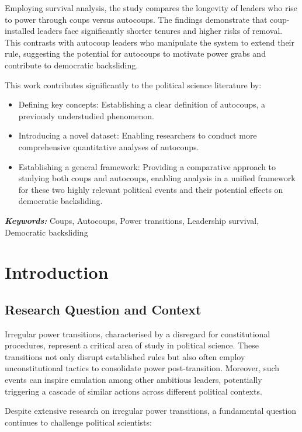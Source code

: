 \documentclass[
  12pt,
]{report}
\begin{document}
Employing survival analysis, the study compares the longevity of leaders
who rise to power through coups versus autocoups. The findings
demonstrate that coup-installed leaders face significantly shorter
tenures and higher risks of removal. This contrasts with autocoup
leaders who manipulate the system to extend their rule, suggesting the
potential for autocoups to motivate power grabs and contribute to
democratic backsliding.

This work contributes significantly to the political science literature
by:

\begin{itemize}
\item
  Defining key concepts: Establishing a clear definition of autocoups, a
  previously understudied phenomenon.
\item
  Introducing a novel dataset: Enabling researchers to conduct more
  comprehensive quantitative analyses of autocoups.
\item
  Establishing a general framework: Providing a comparative approach to
  studying both coups and autocoups, enabling analysis in a unified
  framework for these two highly relevant political events and their
  potential effects on democratic backsliding.
\end{itemize}

\textbf{\emph{Keywords:}} Coups, Autocoups, Power transitions,
Leadership survival, Democratic backsliding

\chapter{Introduction}\label{introduction}

\section{Research Question and
Context}\label{research-question-and-context}

Irregular power transitions, characterised by a disregard for
constitutional procedures, represent a critical area of study in
political science. These transitions not only disrupt established rules
but also often employ unconstitutional tactics to consolidate power
post-transition. Moreover, such events can inspire emulation among other
ambitious leaders, potentially triggering a cascade of similar actions
across different political contexts.

Despite extensive research on irregular power transitions, a fundamental
question continues to challenge political scientists:
\end{document}
